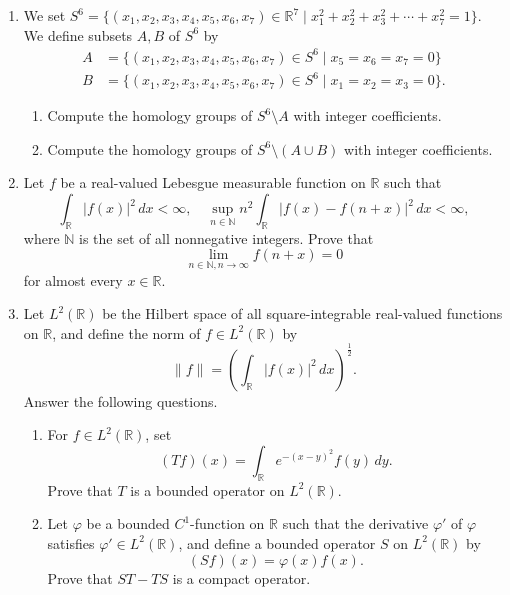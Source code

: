 \documentclass{article}
\begin{document}
\begin{enumerate}[label=\fbox{\arabic*}]
  \item We set $S^6 = \{ (x_1, x_2, x_3, x_4, x_5, x_6, x_7) \in \mathbb{R}^7 \mid x_1^2 + x_2^2 + x_3^2 + \cdots + x_7^2 = 1 \}$. We define subsets $A, B$ of $S^6$ by
        \begin{align*}
          A &= \{ (x_1, x_2, x_3, x_4, x_5, x_6, x_7) \in S^6 \mid x_5 = x_6 = x_7 = 0 \} \\
          B &= \{ (x_1, x_2, x_3, x_4, x_5, x_6, x_7) \in S^6 \mid x_1 = x_2 = x_3 = 0 \}.
        \end{align*}
        \begin{enumerate}[label=(\arabic*)]
          \item Compute the homology groups of $S^6 \setminus A$ with integer coefficients.
          \item Compute the homology groups of $S^6 \setminus (A \cup B)$ with integer coefficients.
        \end{enumerate}

  \item Let $f$ be a real-valued Lebesgue measurable function on $\mathbb{R}$ such that
        \[
          \int_{\mathbb{R}} |f(x)|^2 \, dx < \infty, \quad \sup_{n \in \mathbb{N}} n^2 \int_{\mathbb{R}} |f(x) - f(n + x)|^2 \, dx < \infty,
        \]
        where $\mathbb{N}$ is the set of all nonnegative integers. Prove that
        \[
          \lim_{n \in \mathbb{N}, n \to \infty} f(n + x) = 0
        \]
        for almost every $x \in \mathbb{R}$.

  \item Let $L^2(\mathbb{R})$ be the Hilbert space of all square-integrable real-valued functions on $\mathbb{R}$, and define the norm of $f \in L^2(\mathbb{R})$ by
        \[
          \|f\| = \left( \int_{\mathbb{R}} |f(x)|^2 \, dx \right)^{\frac{1}{2}}.
        \]
        Answer the following questions.
        \begin{enumerate}[label=(\arabic*)]
          \item For $f \in L^2(\mathbb{R})$, set
                \[
                  (Tf)(x) = \int_{\mathbb{R}} e^{-(x-y)^2} f(y) \, dy.
                \]
                Prove that $T$ is a bounded operator on $L^2(\mathbb{R})$.
          \item Let $\varphi$ be a bounded $C^1$-function on $\mathbb{R}$ such that the derivative $\varphi'$ of $\varphi$ satisfies $\varphi' \in L^2(\mathbb{R})$, and define a bounded operator $S$ on $L^2(\mathbb{R})$ by
                \[
                  (Sf)(x) = \varphi(x) f(x).
                \]
                Prove that $ST - TS$ is a compact operator.
        \end{enumerate}


\end{enumerate}
\end{document}
